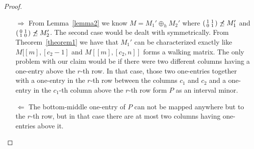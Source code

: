 \begin{proof}
\begin{itemize}
\item[$\Rightarrow$] From Lemma~\ref{lemma2} we know $M=M_1'\oplus_hM_2'$ where $\left(\begin{smallmatrix}1&1\\0&1\end{smallmatrix}\right)\not\preceq M_1'$ and $\left(\begin{smallmatrix}0&1\\1&0\end{smallmatrix}\right)\not\preceq M_2'$. The second case would be dealt with symmetrically. From Theorem~\ref{theorem1} we have that $M_1'$ can be characterized exactly like $M[[m],[c_2-1]$ and $M[[m],[c_2,n]]$ forms a walking matrix. The only problem with our claim would be if there were two different columns having a one-entry above the $r$-th row. In that case, those two one-entries together with a one-entry in the $r$-th row between the columns $c_1$ and $c_2$ and a one-entry in the $c_1$-th column above the $r$-th row form $P$ as an interval minor.
\item[$\Leftarrow$] The bottom-middle one-entry of $P$ can not be mapped anywhere but to the $r$-th row, but in that case there are at most two columns having one-entries above it. %
\end{itemize}
\end{proof}